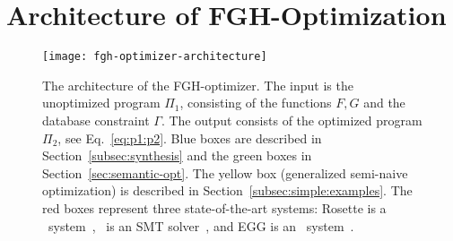 %
%
%

\section{Architecture of FGH-Optimization}\label{sec:optimization}

\begin{figure}
  \centering
  \texttt{[image: fgh-optimizer-architecture]}
  \caption{The architecture of the FGH-optimizer.  The input is the
    unoptimized program $\Pi_1$, consisting of the functions $F, G$ and
    the database constraint $\Gamma$. The output consists of the
    optimized program $\Pi_2$, see Eq.~\eqref{eq:p1:p2}.  Blue boxes are
    described in Section~\ref{subsec:synthesis} and the green boxes in
    Section~\ref{sec:semantic-opt}.  The yellow box
    (generalized semi-naive optimization) is described in
    Section~\ref{subsec:simple:examples}.  The red boxes represent
    three state-of-the-art systems: Rosette is a \cegis\ system~\cite{DBLP:conf/asplos/Solar-LezamaTBSS06,DBLP:conf/tacas/TorlakJ07,DBLP:conf/oopsla/TorlakB13}, \zzz\ is
    an SMT solver~\cite{10.1007/978-3-540-78800-3_24}, and EGG is an \eqsat\ system~\cite{DBLP:journals/pacmpl/WillseyNWFTP21}.}\label{fig:arch}
\end{figure}


